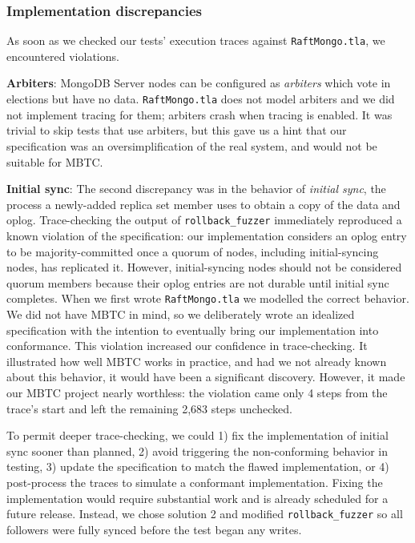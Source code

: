 \documentclass{vldb}
\begin{document}
\subsubsection{Implementation discrepancies}
\label{subsubsec:mbtc_impl_discrepencies}

As soon as we checked our tests' execution traces against \texttt{RaftMongo.tla}, we encountered violations.

\textbf{Arbiters}: MongoDB Server nodes can be configured as \textit{arbiters} which vote in elections but have no data. 
\texttt{RaftMongo.tla} does not model arbiters and we did not implement tracing for them; arbiters crash when tracing is enabled.
It was trivial to skip tests that use arbiters, but this gave us a hint that our specification was an oversimplification of the real system, and would not be suitable for MBTC.

\textbf{Initial sync}: The second discrepancy was in the behavior of \textit{initial sync}, the process a newly-added replica set member uses to obtain a copy of the data and oplog.
Trace-checking the output of \texttt{rollback\_fuzzer} immediately reproduced a known violation of the specification: our implementation considers an oplog entry to be majority-committed once a quorum of nodes, including initial-syncing nodes, has replicated it.
However, initial-syncing nodes should not be considered quorum members because their oplog entries are not durable until initial sync completes.
When we first wrote \texttt{RaftMongo.tla} we modelled the correct behavior.
We did not have MBTC in mind, so we deliberately wrote an idealized specification with the intention to eventually bring our implementation into conformance.
This violation increased our confidence in trace-checking.
It illustrated how well MBTC works in practice, and had we not already known about this behavior, it would have been a significant discovery.
However, it made our MBTC project nearly worthless: the violation came only 4 steps from the trace's start and left the remaining 2,683 steps unchecked.

To permit deeper trace-checking, we could 1) fix the implementation of initial sync sooner than planned, 2) avoid triggering the non-conforming behavior in testing, 3) update the specification to match the flawed implementation, or 4) post-process the traces to simulate a conformant implementation.
Fixing the implementation would require substantial work and is already scheduled for a future release.
Instead, we chose solution 2 and modified \texttt{rollback\_fuzzer} so all followers were fully synced before the test began any writes.
\end{document}

